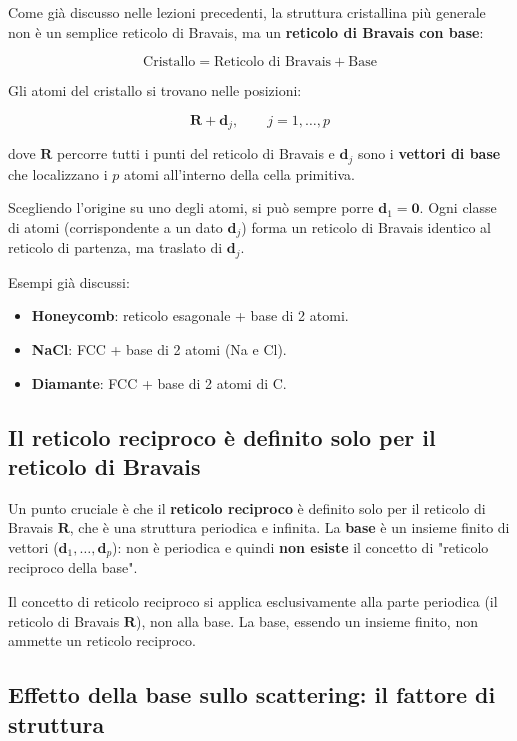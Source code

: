 Come già discusso nelle lezioni precedenti, la struttura cristallina più generale non è un semplice reticolo di Bravais, ma un \textbf{reticolo di Bravais con base}:

$$\text{Cristallo} = \text{Reticolo di Bravais} + \text{Base}$$

Gli atomi del cristallo si trovano nelle posizioni:

$$\mathbf{R} + \mathbf{d}_j, \qquad j = 1, \ldots, p$$

dove $\mathbf{R}$ percorre tutti i punti del reticolo di Bravais e $\mathbf{d}_j$ sono i \textbf{vettori di base} che localizzano i $p$ atomi all'interno della cella primitiva.

Scegliendo l'origine su uno degli atomi, si può sempre porre $\mathbf{d}_1 = \mathbf{0}$. Ogni classe di atomi (corrispondente a un dato $\mathbf{d}_j$) forma un reticolo di Bravais identico al reticolo di partenza, ma traslato di $\mathbf{d}_j$.

Esempi già discussi:
\begin{itemize}
    \item \textbf{Honeycomb}: reticolo esagonale + base di 2 atomi.
    \item \textbf{NaCl}: FCC + base di 2 atomi (Na e Cl).
    \item \textbf{Diamante}: FCC + base di 2 atomi di C.
\end{itemize}

\subsection*{Il reticolo reciproco è definito solo per il reticolo di Bravais}

Un punto cruciale è che il \textbf{reticolo reciproco} è definito solo per il reticolo di Bravais $\mathbf{R}$, che è una struttura periodica e infinita. La \textbf{base} è un insieme finito di vettori ($\mathbf{d}_1, \ldots, \mathbf{d}_p$): non è periodica e quindi \textbf{non esiste} il concetto di "reticolo reciproco della base".

\begin{nota}
Il concetto di reticolo reciproco si applica esclusivamente alla parte periodica (il reticolo di Bravais $\mathbf{R}$), non alla base. La base, essendo un insieme finito, non ammette un reticolo reciproco.
\end{nota}



\subsection*{Effetto della base sullo scattering: il fattore di struttura}


